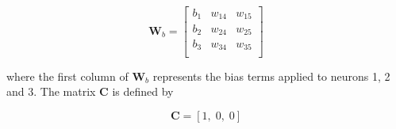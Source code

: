 \begin{enumerate}
\begin{solution}
\begin{enumerate}
      \[
      \mathbf{W}_b = 
      \left[\begin{array}{ccc}
          b_{1} & w_{14} & w_{15} \\
          b_{2} & w_{24} & w_{25} \\
          b_{3} & w_{34} & w_{35} \\
        \end{array}\right]
      \]

      where the first column of $\mathbf{W}_b$ represents the bias terms applied to
      neurons 1, 2 and 3. The matrix $\mathbf{C}$ is defined by

      \[
      \mathbf{C} = [1, \; 0, \; 0]
      \]
    \end{enumerate}
  \end{solution}
  
\end{enumerate}





